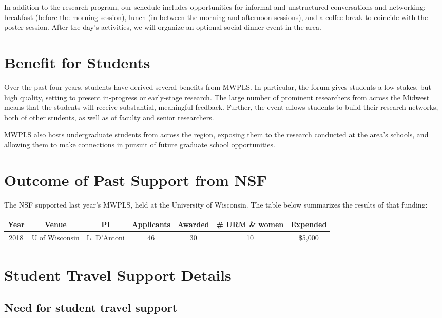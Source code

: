 \documentclass[11pt]{article}
\begin{document}
In addition to the research program, our schedule includes
opportunities for informal and unstructured conversations and
networking: breakfast (before the morning session), lunch (in between
the morning and afternoon sessions), and a coffee break to coincide
with the poster session. After the day's activities, we will organize
an optional social dinner event in the area.

\section{Benefit for Students}

Over the past four years, students have derived several benefits from MWPLS. In particular, the forum gives students a low-stakes, but high quality, setting to present in-progress or early-stage research. The large number of prominent researchers from across the Midwest means that the students will receive substantial, meaningful feedback. Further, the event allows students to build their research networks, both of other students, as well as of faculty and senior researchers.

MWPLS also hosts undergraduate students from across the region, exposing them to the research conducted at the area's schools, and allowing them to make connections in pursuit of future graduate school opportunities.

\section{Outcome of Past Support from NSF}

The NSF supported last year's MWPLS, held at the University of Wisconsin. The table below summarizes the results of that funding:

\noindent
\begin{tabular}{ccccccc}
	Year & Venue & PI & Applicants & Awarded & \# URM \& women & Expended \\
	\hline
	2018 & U of Wisconsin & L. D'Antoni & 46 & 30 & 10 & \$5,000 \\
\end{tabular}

\section{Student Travel Support Details}

\subsection{Need for student travel support}
\end{document}
